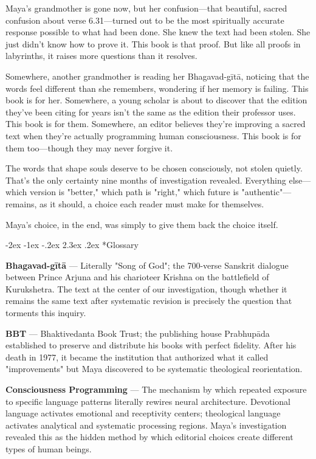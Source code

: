 \documentclass[12pt,twoside]{book}
\makeatletter
\def\cleardoublepage{\clearpage\if@twoside \ifodd\c@page\else\hbox{}\thispagestyle{empty}\newpage\if@twocolumn\hbox{}\newpage\fi\fi\fi}
\renewcommand\section{\@startsection{section}{1}{\z@}%
{-2ex \@plus -1ex \@minus -.2ex}%
{2.3ex \@plus.2ex}%
{\normalfont\Large\bfseries}}
\makeatother
\begin{document}
Maya's grandmother is gone now, but her confusion—that beautiful, sacred confusion about verse 6.31—turned out to be the most spiritually accurate response possible to what had been done. She knew the text had been stolen. She just didn't know how to prove it. This book is that proof. But like all proofs in labyrinths, it raises more questions than it resolves.

Somewhere, another grandmother is reading her Bhagavad-gītā, noticing that the words feel different than she remembers, wondering if her memory is failing. This book is for her. Somewhere, a young scholar is about to discover that the edition they've been citing for years isn't the same as the edition their professor uses. This book is for them. Somewhere, an editor believes they're improving a sacred text when they're actually programming human consciousness. This book is for them too—though they may never forgive it.

The words that shape souls deserve to be chosen consciously, not stolen quietly. That's the only certainty nine months of investigation revealed. Everything else—which version is "better," which path is "right," which future is "authentic"—remains, as it should, a choice each reader must make for themselves.

Maya's choice, in the end, was simply to give them back the choice itself.

\cleardoublepage
\section*{Glossary}
\thispagestyle{sectionopening}

\textbf{Bhagavad-gītā} — Literally "Song of God"; the 700-verse Sanskrit dialogue between Prince Arjuna and his charioteer Krishna on the battlefield of Kurukshetra. The text at the center of our investigation, though whether it remains the same text after systematic revision is precisely the question that torments this inquiry.

\textbf{BBT} — Bhaktivedanta Book Trust; the publishing house Prabhupāda established to preserve and distribute his books with perfect fidelity. After his death in 1977, it became the institution that authorized what it called "improvements" but Maya discovered to be systematic theological reorientation.

\textbf{Consciousness Programming} — The mechanism by which repeated exposure to specific language patterns literally rewires neural architecture. Devotional language activates emotional and receptivity centers; theological language activates analytical and systematic processing regions. Maya's investigation revealed this as the hidden method by which editorial choices create different types of human beings.
\end{document}
